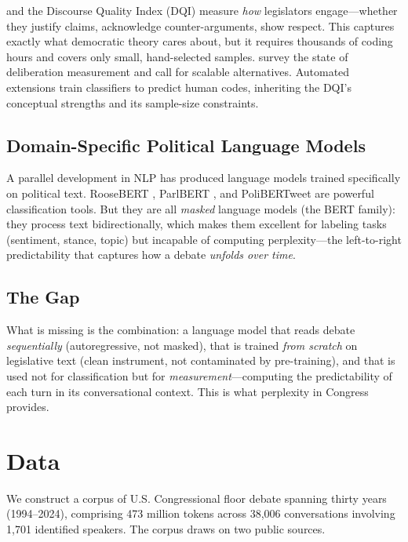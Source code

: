 \documentclass[12pt]{article}
\begin{document}
\citet{steiner2004} and the Discourse Quality Index (DQI) measure \textit{how} legislators engage---whether they justify claims, acknowledge counter-arguments, show respect. This captures exactly what democratic theory cares about, but it requires thousands of coding hours and covers only small, hand-selected samples. \citet{bachtiger2019} survey the state of deliberation measurement and call for scalable alternatives. Automated extensions \citep{fournierTombs2021, flores2024} train classifiers to predict human codes, inheriting the DQI's conceptual strengths and its sample-size constraints.

\subsection{Domain-Specific Political Language Models}

A parallel development in NLP has produced language models trained specifically on political text. RooseBERT \citep{evrard2025}, ParlBERT \citep{klamm2022}, and PoliBERTweet \citep{kawintiranon2022} are powerful classification tools. But they are all \textit{masked} language models (the BERT family): they process text bidirectionally, which makes them excellent for labeling tasks (sentiment, stance, topic) but incapable of computing perplexity---the left-to-right predictability that captures how a debate \textit{unfolds over time}.

\subsection{The Gap}

What is missing is the combination: a language model that reads debate \textit{sequentially} (autoregressive, not masked), that is trained \textit{from scratch} on legislative text (clean instrument, not contaminated by pre-training), and that is used not for classification but for \textit{measurement}---computing the predictability of each turn in its conversational context. This is what perplexity in Congress provides.


\section{Data}

We construct a corpus of U.S. Congressional floor debate spanning thirty years (1994--2024), comprising 473 million tokens across 38,006 conversations involving 1,701 identified speakers. The corpus draws on two public sources.
\end{document}

